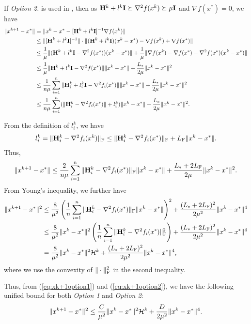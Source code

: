 \documentclass[11pt]{article}
\begin{document}
	If {\em Option 2.} is used in , then as $\mathbf{H}^k + l^k\mathbf{I} \succeq \nabla^2 f(x^k) \succeq \mu \mathbf{I}$ and $\nabla f(x^*) = 0$, we have 
	\begin{align*}
		\|x^{k+1} - x^*\| &= \|x^k - x^* - [\mathbf{H}^k + l^k\mathbf{I}]^{-1} \nabla f(x^k) \| \\
		& \leq \|[\mathbf{H}^k + l^k \mathbf{I}]^{-1}\| \cdot \|(\mathbf{H}^k + l^k \mathbf{I}) (x^k-x^*) - \nabla f(x^k) + \nabla f(x^*)\| \\ 
		& \leq \frac{1}{\mu} \|(\mathbf{H}^k + l^k \mathbf{I} - \nabla^2 f(x^*))(x^k-x^*)\| + \frac{1}{\mu} \|\nabla f(x^k) - \nabla f(x^*) - \nabla^2 f(x^*) (x^k-x^*)\| \\ 
		& \leq \frac{1}{\mu} \|\mathbf{H}^k + l^k\mathbf{I} - \nabla^2 f(x^*)\| \|x^k-x^*\| + \frac{L_{*}}{2\mu}\|x^k-x^*\|^2 \\ 
		& \leq \frac{1}{n\mu} \sum_{i=1}^n \|\mathbf{H}_i^k + l_i^k\mathbf{I} - \nabla^2 f_i(x^*)\| \|x^k-x^*\| + \frac{L_{*}}{2\mu}\|x^k-x^*\|^2 \\ 
		& \leq \frac{1}{n\mu} \sum_{i=1}^n (\|\mathbf{H}_i^k - \nabla^2 f_i(x^*)\| + l_i^k )\|x^k-x^*\| +  \frac{L_{*}}{2\mu}\|x^k-x^*\|^2. 
	\end{align*}
	
	From the definition of $l_i^k$, we have 
	$$
	l_i^k = \|\mathbf{H}_i^k - \nabla^2 f_i(x^k)\|_{\rm F} \leq \|\mathbf{H}_i^k - \nabla^2 f_i(x^*)\|_{\rm F} + L_{\rm F} \|x^k-x^*\|. 
	$$
	Thus, 
	$$
	\|x^{k+1} - x^*\|  \leq \frac{2}{n\mu} \sum_{i=1}^n \|\mathbf{H}_i^k - \nabla^2 f_i(x^*)\|_{\rm F} \|x^k-x^*\| + \frac{L_{*}+2L_{\rm F}}{2\mu}\|x^k-x^*\|^2. 
	$$
	From Young's inequality, we further have 
	\begin{align}
		\|x^{k+1} - x^*\|^2 & \leq \frac{8}{\mu^2} \left(  \frac{1}{n} \sum_{i=1}^n \|\mathbf{H}_i^k - \nabla^2 f_i(x^*)\|_{\rm F} \|x^k-x^*\|   \right)^2 + \frac{(L_{*}+2L_{\rm F})^2}{2\mu^2} \|x^k-x^*\|^4 \nonumber \\ 
		& \leq \frac{8}{\mu^2} \|x^k-x^*\|^2 \left(  \frac{1}{n} \sum_{i=1}^n \|\mathbf{H}_i^k - \nabla^2 f_i(x^*)\|^2_{\rm F}  \right) +  \frac{(L_{*}+2L_{\rm F})^2}{2\mu^2} \|x^k-x^*\|^4 \nonumber \\ 
		& = \frac{8}{\mu^2} \|x^k-x^*\|^2 {\cal H}^k + \frac{(L_{*}+2L_{\rm F})^2}{2\mu^2} \|x^k-x^*\|^4,  \label{eq:xk+1option2}
	\end{align}
	where we use the convexity of $\|\cdot\|^2_{\rm F}$ in the second inequality. 
	
	Thus, from (\ref{eq:xk+1option1}) and (\ref{eq:xk+1option2}), we have the following unified bound for both {\em Option 1} and {\em Option 2}:
	\begin{equation}\label{eq:xk+1U}
		\|x^{k+1} - x^*\|^2 \leq \frac{C}{\mu^2} \|x^k-x^*\|^2 {\cal H}^k + \frac{D}{2\mu^2} \|x^k-x^*\|^4. 
	\end{equation}
	
\end{document}
